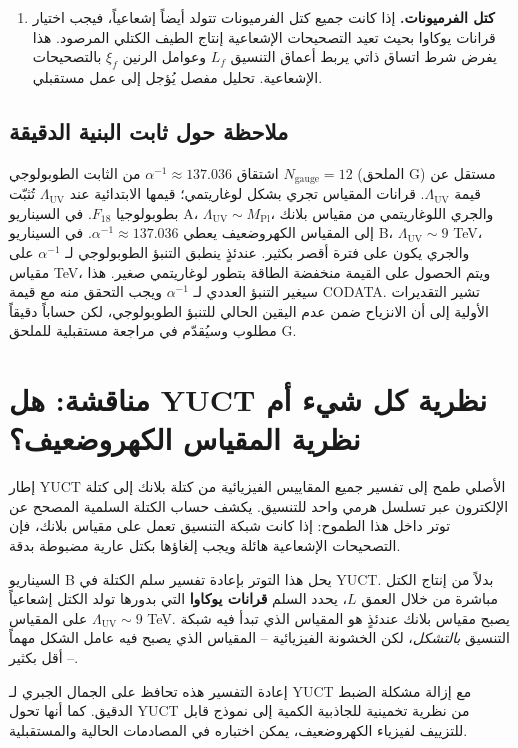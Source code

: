 \documentclass[11pt,a4paper]{article}
\newcommand{\Mpl}{M_{\mathrm{Pl}}}
\newcommand{\LUV}{\Lambda_{\mathrm{UV}}}
\theoremstyle{remark}
\begin{document}
\begin{otherlanguage}{arabic}
\begin{enumerate}[label=(\arabic*)]
			\item \textbf{كتل الفرميونات.} إذا كانت جميع كتل الفرميونات تتولد أيضاً إشعاعياً، فيجب اختيار قرانات يوكاوا بحيث تعيد التصحيحات الإشعاعية إنتاج الطيف الكتلي المرصود. هذا يفرض شرط اتساق ذاتي يربط أعماق التنسيق \(L_f\) وعوامل الرنين \(\xi_f\) بالتصحيحات الإشعاعية. تحليل مفصل يُؤجل إلى عمل مستقبلي.
		\end{enumerate}
		
		\subsection{ملاحظة حول ثابت البنية الدقيقة}
		اشتقاق \(\alpha^{-1} \approx 137.036\) من الثابت الطوبولوجي \(N_{\mathrm{gauge}} = 12\) (الملحق G) مستقل عن قيمة \(\LUV\). قرانات المقياس تجري بشكل لوغاريتمي؛ قيمها الابتدائية عند \(\LUV\) تُثبّت بطوبولوجيا \(F_{18}\). في السيناريو A، \(\LUV \sim \Mpl\)، والجري اللوغاريتمي من مقياس بلانك إلى المقياس الكهروضعيف يعطي \(\alpha^{-1} \approx 137.036\). في السيناريو B، \(\LUV \sim 9\) TeV، والجري يكون على فترة أقصر بكثير. عندئذٍ ينطبق التنبؤ الطوبولوجي لـ \(\alpha^{-1}\) على مقياس TeV، ويتم الحصول على القيمة منخفضة الطاقة بتطور لوغاريتمي صغير. هذا سيغير التنبؤ العددي لـ \(\alpha^{-1}\) ويجب التحقق منه مع قيمة CODATA. تشير التقديرات الأولية إلى أن الانزياح ضمن عدم اليقين الحالي للتنبؤ الطوبولوجي، لكن حساباً دقيقاً مطلوب وسيُقدّم في مراجعة مستقبلية للملحق G.
		
		\section{مناقشة: هل YUCT نظرية كل شيء أم نظرية المقياس الكهروضعيف؟}
		\label{sec:discussion}
		
		إطار YUCT الأصلي طمح إلى تفسير جميع المقاييس الفيزيائية من كتلة بلانك إلى كتلة الإلكترون عبر تسلسل هرمي واحد للتنسيق. يكشف حساب الكتلة السلمية المصحح عن توتر داخل هذا الطموح: إذا كانت شبكة التنسيق تعمل على مقياس بلانك، فإن التصحيحات الإشعاعية هائلة ويجب إلغاؤها بكتل عارية مضبوطة بدقة.
		
		السيناريو B يحل هذا التوتر بإعادة تفسير سلم الكتلة في YUCT. بدلاً من إنتاج الكتل مباشرة من خلال العمق \(L\)، يحدد السلم \textbf{قرانات يوكاوا} التي بدورها تولد الكتل إشعاعياً على المقياس \(\LUV \sim 9\) TeV. يصبح مقياس بلانك عندئذٍ هو المقياس الذي تبدأ فيه شبكة التنسيق \textit{بالتشكل}، لكن الخشونة الفيزيائية – المقياس الذي يصبح فيه عامل الشكل مهماً – أقل بكثير.
		
		إعادة التفسير هذه تحافظ على الجمال الجبري لـ YUCT مع إزالة مشكلة الضبط الدقيق. كما أنها تحول YUCT من نظرية تخمينية للجاذبية الكمية إلى نموذج قابل للتزييف لفيزياء الكهروضعيف، يمكن اختباره في المصادمات الحالية والمستقبلية.
		

\end{otherlanguage}
\end{document}
